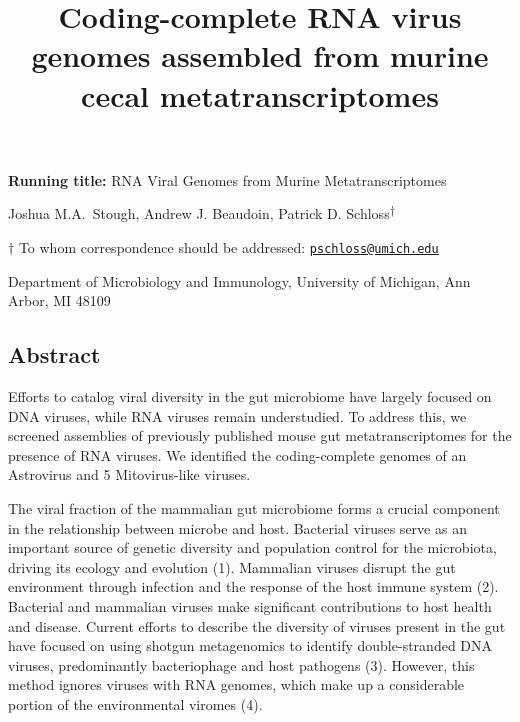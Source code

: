 \documentclass[
  11pt,
]{article}
\title{\textbf{Coding-complete RNA virus genomes assembled from murine cecal
metatranscriptomes}}
\author{}
\date{\vspace{-2.5em}}
\begin{document}
\maketitle

\vspace{35mm}

\textbf{Running title:} RNA Viral Genomes from Murine Metatranscriptomes

\vspace{35mm}

Joshua M.A.~Stough, Andrew J. Beaudoin, Patrick D.
Schloss\textsuperscript{\(\dagger\)}

\vspace{40mm}

\(\dagger\) To whom correspondence should be addressed:
\href{mailto:pschloss@umich.edu}{\nolinkurl{pschloss@umich.edu}}

Department of Microbiology and Immunology, University of Michigan, Ann
Arbor, MI 48109

\newpage
\linenumbers

\hypertarget{abstract}{%
\subsection{Abstract}\label{abstract}}

Efforts to catalog viral diversity in the gut microbiome have largely
focused on DNA viruses, while RNA viruses remain understudied. To
address this, we screened assemblies of previously published mouse gut
metatranscriptomes for the presence of RNA viruses. We identified the
coding-complete genomes of an Astrovirus and 5 Mitovirus-like viruses.

\newpage

The viral fraction of the mammalian gut microbiome forms a crucial
component in the relationship between microbe and host. Bacterial
viruses serve as an important source of genetic diversity and population
control for the microbiota, driving its ecology and evolution (1).
Mammalian viruses disrupt the gut environment through infection and the
response of the host immune system (2). Bacterial and mammalian viruses
make significant contributions to host health and disease. Current
efforts to describe the diversity of viruses present in the gut have
focused on using shotgun metagenomics to identify double-stranded DNA
viruses, predominantly bacteriophage and host pathogens (3). However,
this method ignores viruses with RNA genomes, which make up a
considerable portion of the environmental viromes (4).
\end{document}
